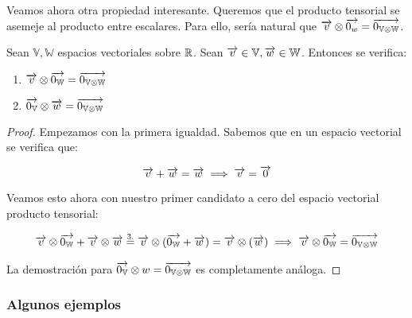Veamos ahora otra propiedad interesante. Queremos que el producto tensorial se asemeje al producto entre escalares. Para ello, sería natural que $\overrightarrow{v} \otimes \overrightarrow{0_w} = \overrightarrow{0_{\mathbb{V} \otimes \mathbb{W}}}$.

\begin{proposicion}
    Sean $\mathbb{V}, \mathbb{W}$ espacios vectoriales sobre $\mathbb{R}$. Sean $\overrightarrow{v} \in \mathbb{V}, \overrightarrow{w} \in \mathbb{W}$. Entonces se verifica:

    \begin{enumerate}
        \item $\overrightarrow{v} \otimes \overrightarrow{0_\mathbb{W}} = \overrightarrow{0_{\mathbb{V} \otimes \mathbb{W}}}$
        \item $\overrightarrow{0_{\mathbb{V}}} \otimes \overrightarrow{w} = \overrightarrow{0_{\mathbb{V} \otimes \mathbb{W}}}$
    \end{enumerate}
\end{proposicion}
\begin{proof}
    Empezamos con la primera igualdad. Sabemos que en un espacio vectorial se verifica que:

    \begin{equation} \label{eq:dem_tensor_cero}
        \overrightarrow{v} + \overrightarrow{w} = \overrightarrow{w} \implies \overrightarrow{v} = \overrightarrow{0}
    \end{equation}

    Veamos esto ahora con nuestro primer candidato a cero del espacio vectorial producto tensorial:

    \begin{equation}
    \begin{split}
        \overrightarrow{v} \otimes \overrightarrow{0_\mathbb{W}} + \overrightarrow{v} \otimes \overrightarrow{w} \stackrel{\text{3.}}{=} \overrightarrow{v} \otimes (\overrightarrow{0_\mathbb{W}} + \overrightarrow{w}) = \overrightarrow{v} \otimes (\overrightarrow{w}) \implies \overrightarrow{v} \otimes \overrightarrow{0_\mathbb{W}} = \overrightarrow{0_{\mathbb{V} \otimes \mathbb{W}}}
    \end{split}
    \end{equation}

    La demostración para $\overrightarrow{0_{\mathbb{V}}} \otimes w = \overrightarrow{0_{\mathbb{V} \otimes \mathbb{W}}}$ es completamente análoga.
\end{proof}

\subsubsection{Algunos ejemplos}

